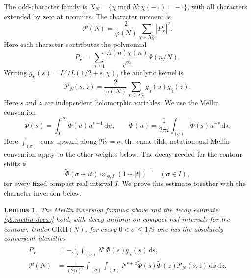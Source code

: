 \documentclass[12pt,a4paper]{amsart}
\numberwithin{equation}{section}
\def\le{\leqslant}
\def\ge{\geqslant}
\theoremstyle{plain}
\newtheorem{lemma}[proposition]{Lemma}
\theoremstyle{definition}
\theoremstyle{remark}
\begin{document}
The odd-character family is
$X_N^-=\{\chi\ \mathrm{mod}\ N:\chi(-1)=-1\}$, with all characters extended
by zero at nonunits. The character moment is
\[
 \mathcal P(N)=\frac2{\varphi(N)}
                 \sum_{\chi\in X_N^-}|P_\chi|^2.
\]
Here each character contributes the polynomial
\[
 P_\chi=\sum_{n\ge1}
       \frac{\Lambda(n)\chi(n)}{\sqrt n}\Phi(n/N).
\]
Writing $g_\chi(s)=L'/L(1/2+s,\chi)$, the analytic kernel is
\[
 \mathscr P_N(s,z)=\frac2{\varphi(N)}\sum_{\chi\in X_N^-}
                          g_\chi(s)g_{\bar\chi}(z).
\]
Here $s$ and $z$ are independent holomorphic variables. We use the
Mellin convention
\[
 \widetilde\Phi(s)=\int_0^\infty\Phi(u)u^{s-1}\,\mathrm{d}u,
 \qquad
 \Phi(u)=\frac1{2\pi i}\int_{(\sigma)}\widetilde\Phi(s)u^{-s}\,\mathrm{d}s.
\]
Here $\int_{(\sigma)}$ runs upward along $\Re s=\sigma$; the same
tilde notation and Mellin convention apply to the other weights below.
The decay needed for the contour shifts is
\begin{equation}\label{gb:mellin-decay}
 \widetilde{\Phi}(\sigma+it)\ll_{\phi,I}(1+|t|)^{-6}
 \quad(\sigma\in I),
\end{equation}
for every fixed compact real interval $I$. We prove this estimate
together with the character inversion below.

\begin{lemma}\label{proof:gb:mellin-projection}
The Mellin inversion formula above and the decay estimate
\eqref{gb:mellin-decay} hold, with decay uniform on compact real
intervals for the contour. Under $\mathrm{GRH}(N)$, for every
$0<\sigma\le1/9$ one has the absolutely convergent identities
\begin{align}
 P_\chi&=-\frac1{2\pi i}\int_{(\sigma)}
               N^s\widetilde\Phi(s)g_\chi(s)\,\mathrm{d}s,
               \label{proof:gb:character-inversion}\\
 \mathcal P(N)&=\frac1{(2\pi i)^2}
   \int_{(\sigma)}\int_{(\sigma)}
   N^{s+z}\widetilde\Phi(s)\widetilde\Phi(z)
                 \mathscr P_N(s,z)\,\mathrm{d}s\,\mathrm{d}z.
                 \label{proof:gb:moment-inversion}
\end{align}
\end{lemma}
\end{document}
